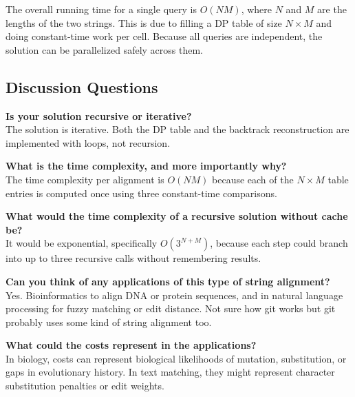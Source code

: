 \documentclass{article}
\begin{document}
The overall running time for a single query is \( O(NM) \), where \( N \) and \( M \) are the lengths of the two strings. This is due to filling a DP table of size \( N \times M \) and doing constant-time work per cell. Because all queries are independent, the solution can be parallelized safely across them.

\subsection*{Discussion Questions}

\textbf{Is your solution recursive or iterative?} \\
The solution is iterative. Both the DP table and the backtrack reconstruction are implemented with loops, not recursion.

\vspace{1em}
\textbf{What is the time complexity, and more importantly why?} \\
The time complexity per alignment is \( O(NM) \) because each of the \( N \times M \) table entries is computed once using three constant-time comparisons.

\vspace{1em}
\textbf{What would the time complexity of a recursive solution without cache be?} \\
It would be exponential, specifically \( O(3^{N+M}) \), because each step could branch into up to three recursive calls without remembering results.

\vspace{1em}
\textbf{Can you think of any applications of this type of string alignment?} \\
Yes. Bioinformatics to align DNA or protein sequences, and in natural language processing for fuzzy matching or edit distance. Not sure how git works but git probably uses some kind of string alignment too.

\vspace{1em}
\textbf{What could the costs represent in the applications?} \\
In biology, costs can represent biological likelihoods of mutation, substitution, or gaps in evolutionary history. In text matching, they might represent character substitution penalties or edit weights.
\end{document}
